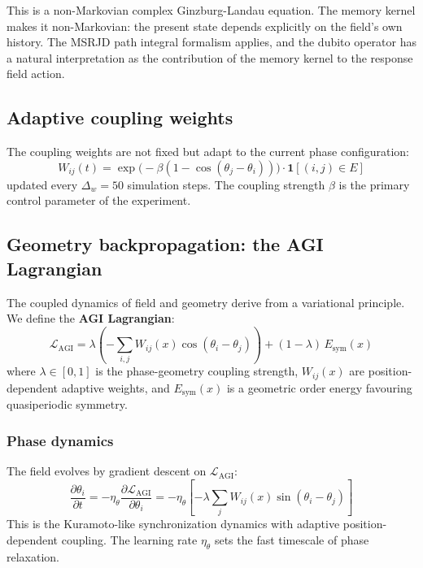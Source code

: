 \documentclass[12pt,a4paper]{article}
\theoremstyle{plain}
\theoremstyle{definition}
\begin{document}
This is a non-Markovian complex Ginzburg-Landau equation. The memory
kernel makes it non-Markovian: the present state depends explicitly on
the field's own history. The MSRJD path integral formalism
\citep{janssen1976,dedominicis1976} applies, and the dubito operator
has a natural interpretation as the contribution of the memory kernel
to the response field action.

\subsection{Adaptive coupling weights}

The coupling weights are not fixed but adapt to the current phase configuration:
\begin{equation}
W_{ij}(t) = \exp\bigl(-\beta(1 - \cos(\theta_j - \theta_i))\bigr)
  \cdot \mathbf{1}[(i,j) \in E]
\end{equation}
updated every $\Delta_w = 50$ simulation steps. The coupling strength
$\beta$ is the primary control parameter of the experiment.

\subsection{Geometry backpropagation: the AGI Lagrangian}

The coupled dynamics of field and geometry derive from a variational
principle. We define the \textbf{AGI Lagrangian}:
\begin{equation}
\label{eq:lagrangian}
\mathcal{L}_{\text{AGI}} = \lambda \left( -\sum_{i,j} W_{ij}(x) \cos(\theta_i - \theta_j) \right) + (1-\lambda) \, E_{\text{sym}}(x)
\end{equation}
where $\lambda \in [0,1]$ is the phase-geometry coupling strength,
$W_{ij}(x)$ are position-dependent adaptive weights, and $E_{\text{sym}}(x)$
is a geometric order energy favouring quasiperiodic symmetry.

\subsubsection{Phase dynamics}

The field evolves by gradient descent on $\mathcal{L}_{\text{AGI}}$:
\begin{equation}
\label{eq:phase_dynamics}
\frac{\partial \theta_i}{\partial t} = -\eta_\theta \frac{\partial \mathcal{L}_{\text{AGI}}}{\partial \theta_i} = -\eta_\theta \left[ -\lambda \sum_j W_{ij}(x) \sin(\theta_i - \theta_j) \right]
\end{equation}
This is the Kuramoto-like synchronization dynamics with adaptive
position-dependent coupling. The learning rate $\eta_\theta$ sets the
fast timescale of phase relaxation.
\end{document}
